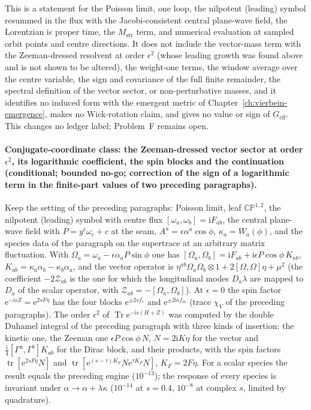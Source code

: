 This is a statement for the Poisson limit, one loop, the nilpotent (leading) symbol resummed in the flux with the Jacobi-consistent central plane-wave field, the Lorentzian \(\mathrm i\epsilon\) proper time, the \(M_{\mathrm{str}}\) term, and numerical evaluation at sampled orbit points and centre directions. It does not include the vector-mass term with the Zeeman-dressed resolvent at order \(\epsilon^2\) (whose leading growth was found above and is not shown to be altered), the weight-one terms, the window average over the centre variable, the sign and covariance of the full finite remainder, the spectral definition of the vector sector, or non-perturbative masses, and it identifies no induced form with the emergent metric of Chapter~\ref{ch:vierbein-emergence}, makes no Wick-rotation claim, and gives no value or sign of \(G_{\mathrm{eff}}\). This changes no ledger label; Problem~F remains open.

\paragraph{Conjugate-coordinate class: the Zeeman-dressed vector sector at order \(\epsilon^2\), its logarithmic coefficient, the spin blocks and the continuation (conditional; bounded no-go; correction of the sign of a logarithmic term in the finite-part values of two preceding paragraphs).}
Keep the setting of the preceding paragraphs: Poisson limit, leaf \(\mathbb{CP}^{1,2}\), the nilpotent (leading) symbol with centre flux \([\omega_a,\omega_b]=\mathrm iF_{ab}\), the central plane-wave field with \(P=y^c\omega_c+c\) at the seam, \(A^a=\epsilon\alpha^a\cos\phi\), \(\kappa_a=W_a(\phi)\), and the species data of the paragraph on the supertrace at an arbitrary matrix fluctuation. With \(\Omega_a=\omega_a-\epsilon\alpha_aP\sin\phi\) one has \([\Omega_a,\Omega_b]=\mathrm iF_{ab}+\mathrm i\epsilon P\cos\phi\,K_{ab}\), \(K_{ab}=\kappa_a\alpha_b-\kappa_b\alpha_a\), and the vector operator is \(\eta^{ab}\Omega_a\Omega_b\otimes1+2[\Omega,\Omega]\eta+\mu^2\) (the coefficient \(-2\mathcal Z_{ab}\) is the one for which the longitudinal modes \(D_a\lambda\) are mapped to \(D_a\) of the scalar operator, with \(\mathcal Z_{ab}=-[\Omega_a,\Omega_b]\)). At \(\epsilon=0\) the spin factor \(\mathrm e^{-\mathrm is Z}=\mathrm e^{2sF\eta}\) has the four blocks \(\mathrm e^{\pm2sf_e}\) and \(\mathrm e^{\pm2\mathrm isf_m}\) (trace \(\chi_V\) of the preceding paragraphs). The order \(\epsilon^2\) of \(\operatorname{Tr}\mathrm e^{-\mathrm is(H+Z)}\) was computed by the double Duhamel integral of the preceding paragraph with three kinds of insertion: the kinetic one, the Zeeman one \(\epsilon P\cos\phi\,N\), \(N=2\mathrm iK\eta\) for the vector and \(\tfrac{\mathrm i}{4}[\Gamma^a,\Gamma^b]K_{ab}\) for the Dirac block, and their products, with the spin factors \(\operatorname{tr}[\mathrm e^{2sF\eta}N]\) and \(\operatorname{tr}[\mathrm e^{(s-\tau)K_F}N\mathrm e^{\tau K_F}N]\), \(K_F=2F\eta\). For a scalar species the result equals the preceding engine (\(10^{-13}\)); the response of every species is invariant under \(\alpha\to\alpha+\lambda\kappa\) (\(10^{-14}\) at \(s=0.4\), \(10^{-8}\) at complex \(s\), limited by quadrature).

